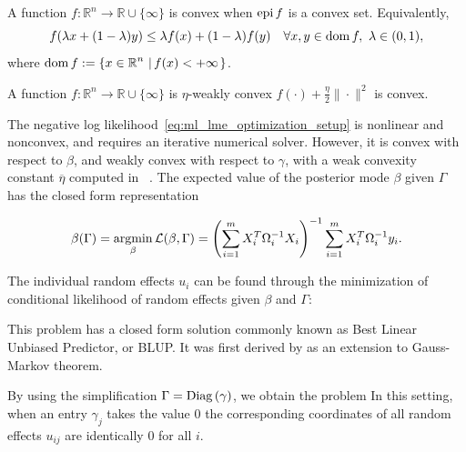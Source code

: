 \begin{definition}[Convexity]
A function $f:\mathbb{R}^n\rightarrow \mathbb{R} \cup \{\infty\}$ is convex when $\operatorname{epi} f$ is a convex set. Equivalently, 
\[
f(\lambda x + (1-\lambda)y) \leq \lambda f(x) + (1-\lambda) f(y) \quad \forall x,y\in\operatorname{\mathrm{dom}}{f},\ \lambda \in (0,1),
\]
where $\operatorname{\mathrm{dom}}{f}:=\left\{x\in{\operatorname{\mathbb{R}}^n}\,\left|\,f(x)<+\infty\right.\right\}$.
\end{definition}

\begin{definition}
A function $f:\mathbb{R}^n\rightarrow \mathbb{R} \cup \{\infty\}$ is $\eta$-weakly convex 
$f(\cdot)+\frac{\eta}{2}\|\cdot\|^2$ is convex. 
\end{definition}

The negative log likelihood~\eqref{eq:ml_lme_optimization_setup}  is nonlinear and nonconvex, and requires an iterative numerical solver.
However, it is convex with respect to $\beta$, and weakly convex with respect to $\gamma$, with a weak convexity constant $\overline \eta$
computed in~\cite[Section 5.1]{Theory1} . The expected value of the posterior mode $\beta$ given $\Gamma$ has the closed form representation 
	
\begin{equation}
	\label{eq:beta_formula}
	\beta(\Gamma) = \operatorname*{\mathrm{argmin}}_{\beta}\operatorname{\mathcal{L}}(\beta, \Gamma) = \left(\sum_{i = 1}^m X_i^T\Omega_i^{-1}X_i\right)^{-1}\sum_{i = 1}^mX_i^T\Omega_i^{-1}y_i.
\end{equation}

The individual random effects $u_i$ can be found through the minimization of conditional likelihood of random effects given $\beta$ and $\Gamma$:


This problem has a closed form solution commonly known as Best Linear Unbiased Predictor, or BLUP. It was first derived by \cite{Harville1976} as an extension to Gauss-Markov theorem.



By using the simplification $\Gamma=\mathrm{Diag}\left(\gamma\right)$, we obtain the problem
In this setting, when an
entry $\gamma_j$ takes the  value $0$ the corresponding coordinates of all random effects $u_{ij}$ are identically $0$ for all $i$. 

